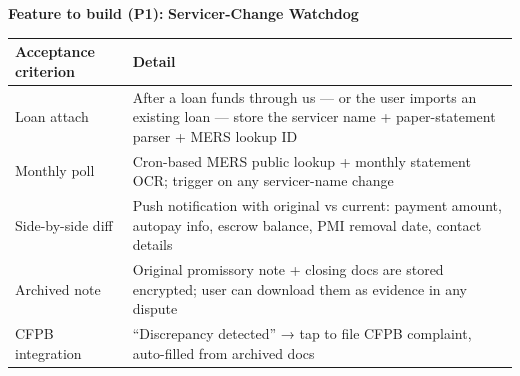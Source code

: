 \documentclass[
  10pt,
]{article}
\begin{document}
\textbf{Feature to build (P1):} \textbf{Servicer-Change Watchdog}

\begin{longtable}[]{@{}ll@{}}
\toprule
\begin{minipage}[b]{0.47\columnwidth}\raggedright
Acceptance criterion\strut
\end{minipage} & \begin{minipage}[b]{0.47\columnwidth}\raggedright
Detail\strut
\end{minipage}\tabularnewline
\midrule
\endhead
\begin{minipage}[t]{0.47\columnwidth}\raggedright
Loan attach\strut
\end{minipage} & \begin{minipage}[t]{0.47\columnwidth}\raggedright
After a loan funds through us --- or the user imports an existing loan --- store the servicer name +
paper-statement parser + MERS lookup ID\strut
\end{minipage}\tabularnewline
\begin{minipage}[t]{0.47\columnwidth}\raggedright
Monthly poll\strut
\end{minipage} & \begin{minipage}[t]{0.47\columnwidth}\raggedright
Cron-based MERS public lookup + monthly statement OCR; trigger on any servicer-name change\strut
\end{minipage}\tabularnewline
\begin{minipage}[t]{0.47\columnwidth}\raggedright
Side-by-side diff\strut
\end{minipage} & \begin{minipage}[t]{0.47\columnwidth}\raggedright
Push notification with original vs current: payment amount, autopay info, escrow balance, PMI
removal date, contact details\strut
\end{minipage}\tabularnewline
\begin{minipage}[t]{0.47\columnwidth}\raggedright
Archived note\strut
\end{minipage} & \begin{minipage}[t]{0.47\columnwidth}\raggedright
Original promissory note + closing docs are stored encrypted; user can download them as evidence in
any dispute\strut
\end{minipage}\tabularnewline
\begin{minipage}[t]{0.47\columnwidth}\raggedright
CFPB integration\strut
\end{minipage} & \begin{minipage}[t]{0.47\columnwidth}\raggedright
``Discrepancy detected'' → tap to file CFPB complaint, auto-filled from archived docs\strut
\end{minipage}\tabularnewline
\bottomrule
\end{longtable}
\end{document}

